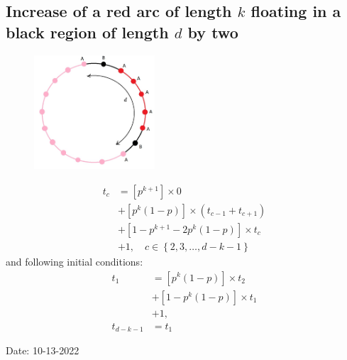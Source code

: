 \documentclass[]{book}
\theoremstyle{definition}
\begin{document}
\subsection{Increase of a red arc of length $k$ floating in a black region of length $d$ by two}
\begin{figure}[H]
    \centering\includegraphics[width=0.4\textwidth]{figures/arc increase.jpg}
    \caption{}
\end{figure}

\begin{equation}
\begin{split}
    t_c &= \left[p^{k+1} \right] \times 0 \\
    &+ \left[ p^k\left( 1-p \right) \right] \times \left( t_{c-1} + t_{c+1} \right) \\
    &+ \left[1 - p^{k+1} - 2p^k\left( 1-p \right) \right] \times t_c \\
    &+ 1, \quad c \in \left\{ 2, 3, \hdots, d - k - 1 \right\}
\end{split}
\end{equation}
and following initial conditions:
\begin{equation}
\begin{split}
    t_1 &= \left[p^k\left( 1-p \right) \right] \times t_2 \\
    &+ \left[ 1 - p^k\left( 1-p \right) \right] \times t_1 \\
    &+ 1, \\
    t_{d-k-1} &= t_1
\end{split}
\end{equation}


\newpage
\begin{center}
Date: 10-13-2022
\end{center}
\end{document}
